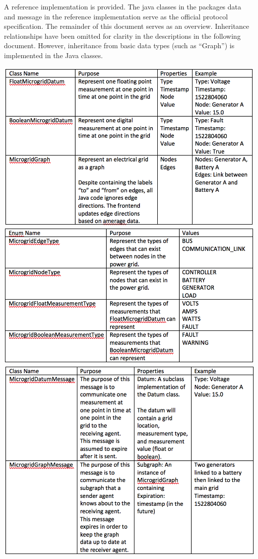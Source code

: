 \documentclass{article}
\begin{document}
A reference implementation is provided. The java classes in the packages data and message in the reference implementation serve as the official protocol specification. The remainder of this document serves as an overview. Inheritance relationships have been omitted for clarity in the descriptions in the following document. However, inheritance from basic data types (such as “Graph”) is implemented in the Java classes.


\includegraphics[width=\textwidth]{tableDataTypes.png}
\includegraphics[width=\textwidth]{tableDataSubtypes.png}
\includegraphics[width=\textwidth]{tableMessageTypes.png}
\end{document}
